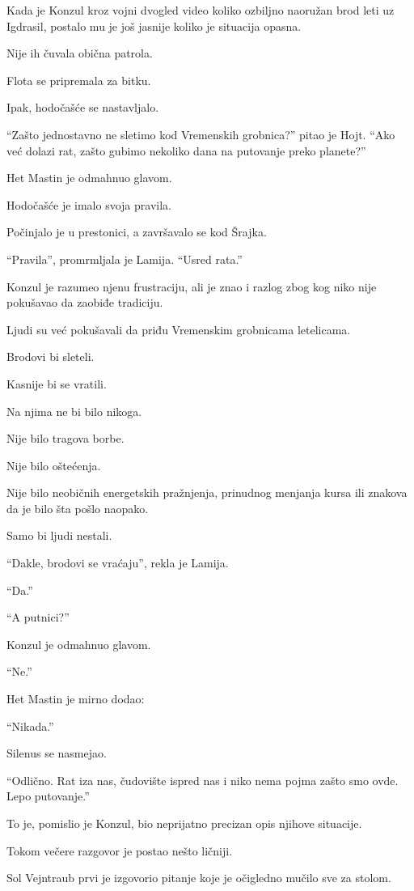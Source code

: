 Kada je Konzul kroz vojni dvogled video koliko ozbiljno naoružan brod leti uz Igdrasil, postalo mu je još jasnije koliko je situacija opasna.

Nije ih čuvala obična patrola.

Flota se pripremala za bitku.

Ipak, hodočašće se nastavljalo.

``Zašto jednostavno ne sletimo kod Vremenskih grobnica?'' pitao je Hojt. ``Ako već dolazi rat, zašto gubimo nekoliko dana na putovanje preko planete?''

Het Mastin je odmahnuo glavom.

Hodočašće je imalo svoja pravila.

Počinjalo je u prestonici, a završavalo se kod Šrajka.

``Pravila'', promrmljala je Lamija. ``Usred rata.''

Konzul je razumeo njenu frustraciju, ali je znao i razlog zbog kog niko nije pokušavao da zaobiđe tradiciju.

Ljudi su već pokušavali da priđu Vremenskim grobnicama letelicama.

Brodovi bi sleteli.

Kasnije bi se vratili.

Na njima ne bi bilo nikoga.

Nije bilo tragova borbe.

Nije bilo oštećenja.

Nije bilo neobičnih energetskih pražnjenja, prinudnog menjanja kursa ili znakova da je bilo šta pošlo naopako.

Samo bi ljudi nestali.

``Dakle, brodovi se vraćaju'', rekla je Lamija.

``Da.''

``A putnici?''

Konzul je odmahnuo glavom.

``Ne.''

Het Mastin je mirno dodao:

``Nikada.''

Silenus se nasmejao.

``Odlično. Rat iza nas, čudovište ispred nas i niko nema pojma zašto smo ovde. Lepo putovanje.''

To je, pomislio je Konzul, bio neprijatno precizan opis njihove situacije.

Tokom večere razgovor je postao nešto ličniji.

Sol Vejntraub prvi je izgovorio pitanje koje je očigledno mučilo sve za stolom.

